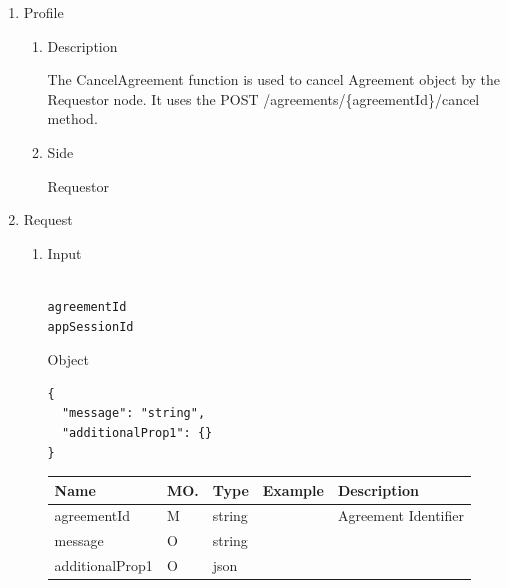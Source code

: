 \begin{enumerate}

\item Profile

\begin{enumerate}

\item Description

The CancelAgreement function is used to cancel Agreement object by the Requestor node. 
It uses the POST /agreements/\{agreementId\}/cancel method.

\item Side

Requestor

\end{enumerate}

\item Request

\begin{enumerate}

\item Input

\begin{tcolorbox}[boxrule=0pt, frame empty]
\begin{verbatim}

agreementId
appSessionId

\end{verbatim}
\end{tcolorbox}

Object
\begin{tcolorbox}[boxrule=0pt, frame empty]
\begin{verbatim}
{
  "message": "string",
  "additionalProp1": {}
}
\end{verbatim}
\end{tcolorbox}

\begin{table}[H]
\footnotesize

\begin{center}
\begin{tabular}{|p{3cm}|l|p{3cm}|p{3cm}|p{4cm}|} 
\hline
\rowcolor{lightgray}	Name	& MO.	& Type	& Example & 	Description \\
\hline

agreementId		& M & 	string				&		& 	Agreement Identifier \\
\hline

message 		& O	& 	string				&		&	 	\\ 
\hline

additionalProp1 & O	& 	json				&		&	 	\\ 
\hline


\end{tabular}
\end{center}
\end{table}
\end{enumerate}
\end{enumerate}
